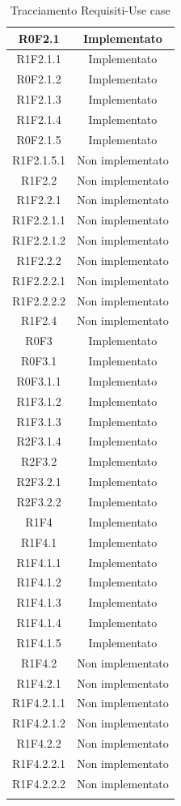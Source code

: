 \begin{longtable}{|c|c|}
	\hline
	R0F2.1 & Implementato\\
	\hline
	R1F2.1.1 & Implementato\\
	\hline
	R0F2.1.2 & Implementato\\
	\hline
	R1F2.1.3 & Implementato\\
	\hline
	R1F2.1.4 & Implementato\\
	\hline
	R0F2.1.5 & Implementato\\
	\hline
	R1F2.1.5.1 & Non implementato\\
	\hline
	R1F2.2 & Non implementato\\
	\hline
	R1F2.2.1 & Non implementato\\
	\hline
	R1F2.2.1.1 & Non implementato\\
	\hline
	R1F2.2.1.2 & Non implementato\\
	\hline
	R1F2.2.2 & Non implementato\\
	\hline
	R1F2.2.2.1 & Non implementato\\
	\hline
	R1F2.2.2.2 & Non implementato\\
	\hline
	R1F2.4 & Non implementato\\
	\hline
	R0F3 & Implementato\\
	\hline
	R0F3.1 & Implementato\\
	\hline
	R0F3.1.1 & Implementato\\
	\hline
	R1F3.1.2 & Implementato\\
	\hline
	R1F3.1.3 & Implementato\\
	\hline
	R2F3.1.4 & Implementato\\
	\hline
	R2F3.2 & Implementato\\
	\hline
	R2F3.2.1 & Implementato\\
	\hline
	R2F3.2.2 & Implementato\\
	\hline
	R1F4 & Implementato\\
	\hline
	R1F4.1 & Implementato\\
	\hline
	R1F4.1.1 & Implementato\\
	\hline
	R1F4.1.2 & Implementato\\
	\hline
	R1F4.1.3 & Implementato\\
	\hline
	R1F4.1.4 & Implementato\\
	\hline
	R1F4.1.5 & Implementato\\
	\hline
	R1F4.2 & Non implementato\\
	\hline
	R1F4.2.1 & Non implementato\\
	\hline
	R1F4.2.1.1 & Non implementato\\
	\hline
	R1F4.2.1.2 & Non implementato\\
	\hline
	R1F4.2.2 & Non implementato\\
	\hline
	R1F4.2.2.1 & Non implementato\\
	\hline
	R1F4.2.2.2 & Non implementato\\
	\hline
	\caption[Tracciamento Requisiti-Use case]{Tracciamento Requisiti-Use case}
\end{longtable}
\clearpage
